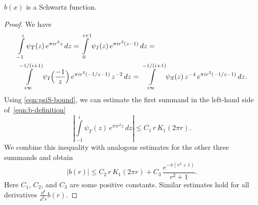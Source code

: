 \begin{proposition}\label{prop:b-schwartz}
$b(x)$ is a Schwartz function.
\end{proposition}
\begin{proof}
We have
\begin{align}
    &\int\limits_{-1}^{i}\psi_T(z)\,e^{\pi i r^2 z}\,dz=\int\limits_{0}^{i+1}\psi_I(z)\,e^{\pi i r^2 (z-1)}\,dz=\notag\\
    &\int\limits_{i\infty}^{-1/(i+1)}\psi_I\Big(\frac{-1}{z}\Big)\,e^{\pi i r^2 (-1/z-1)}\,z^{-2}\,dz=\int\limits_{i\infty}^{-1/(i+1)}\psi_S(z)\,z^{-4}\,e^{\pi i r^2 (-1/z-1)}\,dz.\notag
\end{align}
Using \eqref{eqn:psiS-bound}, we can estimate the first summand in the left-hand side of~\eqref{eqn:b-definition}
\begin{equation}
    \left|\int\limits_{-1}^i \psi_T(z)\,e^{\pi i r^2 z}\,dz \right|\leq C_1\,r\,K_1(2\pi r).
\end{equation}
We combine this inequality with analogous estimates for the other three summands and obtain
\begin{equation}
    |b(r)|\leq C_2\,r\,K_1(2\pi r)+C_3\,\frac{e^{-\pi(r^2+1)}}{r^2+1}.
\end{equation}
Here $C_1$, $C_2$, and $C_3$ are some positive constants. Similar estimates hold for all derivatives $\frac{\dd^k}{\dd^k r} b(r)$.
\end{proof}

